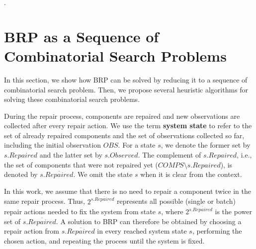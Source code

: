 \documentclass[review]{elsarticle}
\newcommand\roni[1]{\textcolor{green}{roni: #1}}
\newcommand{\repaired}{{\textit{Repaired}}}
\newcommand{\observed}{{\textit{Observed}}}
\newcommand{\notrepaired}{{\overline{\textit{Repaired}}}}
\newcommand{\COMPS}{\textit{COMPS}}
\begin{document}
.





\section{BRP as a Sequence of Combinatorial Search Problems}

In this section, we show how BRP can be solved by reducing it to a sequence of combinatorial search problem. 
Then, we propose several heuristic algorithms for solving these combinatorial search problems.  


During the repair process, components are repaired and new observations are collected after every repair action. 
We use the term {\bf system state} to refer to the set of already repaired components and the set of observations collected so far, including the initial observation $OBS$. 
For a state $s$, we denote the former set by $s.\repaired$ and the latter set by $s.\observed$. 
The complement of $s.\repaired$, i.e., the set of components that were not repaired yet ($\COMPS\setminus s.\repaired$), is denoted by $s.\notrepaired$. We omit the state $s$ when it is clear from the context. 

In this work, we  assume that there is no need to repair a component twice in the same repair process. Thus, $2^{s.\notrepaired}$ represents all possible (single or batch) repair actions needed to fix the system from state $s$, where $2^{s.\notrepaired}$ is the power set of $s.\notrepaired{}$. 
A solution to BRP can therefore be obtained by choosing a repair action from 
$s.\notrepaired{}$ in every reached system state $s$, performing the chosen action, and repeating the process 
until the system is fixed. 
\end{document}
